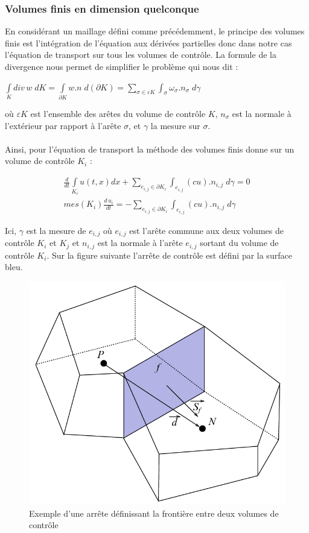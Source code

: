 \documentclass[12pt]{article}
\begin{document}
\subsubsection{Volumes finis en dimension quelconque}
\noindent En considérant un maillage défini comme précédemment, le principe des volumes finis \cite{ref7} est l'intégration de l'équation aux dérivées partielles donc dans notre cas l'équation de transport sur tous les volumes de contrôle. 
La formule de la divergence nous permet de simplifier le problème qui nous dit :
\\
\begin{center}
    $\displaystyle\int\limits_{K} div\, w \; dK=\int\limits_{\partial{K}} w.n \; d(\partial{K}) = \displaystyle\sum_{\sigma \in \varepsilon{K}} \int_{\sigma} \omega_{\sigma}.n_{\sigma} \; d\gamma$
\end{center}
où $\varepsilon K$ est l'ensemble des arêtes du volume de contrôle $K$, $n_{\sigma}$ est la normale à l'extérieur par rapport à l'arête $\sigma$, et $\gamma$ la mesure sur $\sigma$.
\\
\\Ainsi, pour l'équation de transport la méthode des volumes finis donne sur un volume de contrôle $K_i$ :

\begin{eqnarray}
       \frac{d}{dt} \int\limits_{K_i} u(t,x)dx + \displaystyle \sum_{e_{i,j}\in \partial K_i} \int_{e_{i,j}} (cu).{n_{i,j}} \; d\gamma=0
       \\mes(K_i)\frac{d\,u_i}{dt}=-\displaystyle\sum_{e_{i,j}\in \partial K_i} \int_{e_{i,j}} (cu).{n_{i,j}} \; d\gamma
\end{eqnarray}

\noindent Ici, $\gamma$ est la mesure de $e_{i,j}$ où $e_{i,j}$ est l'arête commune aux deux volumes de contrôle $K_i$ et $K_j$ et $n_{i,j}$ est la normale à l'arête $e_{i,j}$ sortant du volume de contrôle $K_i$. 
Sur la figure suivante l'arrête de contrôle est défini par la surface bleu.
 \begin{figure}[H]
	\centering
	\includegraphics[scale=0.2]{volume_controle.png}
	\caption{Exemple d'une arrête définissant la frontière entre deux volumes de contrôle}
	\end{figure}
\end{document}
